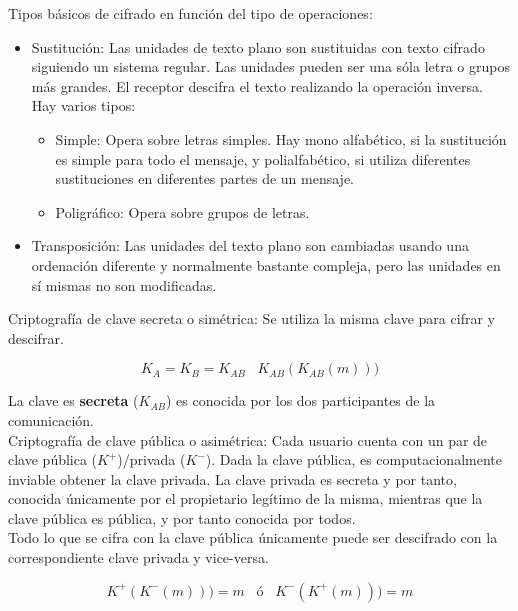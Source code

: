 \documentclass[10pt,portrait, twocolumn]{article}
\begin{document}
	Tipos básicos de cifrado en función del tipo de operaciones:
	
	\begin{itemize}
		\item Sustitución: Las unidades de texto plano son sustituidas con texto cifrado siguiendo un sistema regular. Las unidades pueden ser una sóla letra o grupos más grandes. El receptor descifra el texto realizando la operación inversa. Hay varios tipos:
			\begin{itemize}
				\item Simple: Opera sobre letras simples. Hay mono alfabético, si la sustitución es simple para todo el mensaje, y polialfabético, si utiliza diferentes sustituciones en diferentes partes de un mensaje.
				\item Poligráfico: Opera sobre grupos de letras.
			\end{itemize}
		\item Transposición: Las unidades del texto plano son cambiadas usando una ordenación diferente y normalmente bastante compleja, pero las unidades en sí mismas no son modificadas. 
	\end{itemize}
	
Criptografía de clave secreta o simétrica: Se utiliza la misma clave para cifrar y descifrar.

	\begin{equation*}
		K_A = K_B = K_{AB} \hspace{10pt} K_{AB} (K_{AB}(m)))
	\end{equation*}
	
	La clave es \textbf{secreta} ($K_{AB}$) es conocida por los dos participantes de la comunicación.\\
	
Criptografía de clave pública o asimétrica: Cada usuario cuenta con un par de clave pública ($K^+$)/privada ($K^-$). Dada la clave pública, es computacionalmente inviable obtener la clave privada. La clave privada es secreta y por tanto, conocida únicamente por el propietario legítimo de la misma, mientras que la clave pública es pública, y por tanto conocida por todos.\\
\quad Todo lo que se cifra con la clave pública únicamente puede ser descifrado con la correspondiente clave privada y vice-versa.

	\begin{equation*}
		K^+(K^-(m))) = m \hspace{10pt} \text{ó} \hspace{10pt} K^-(K^+(m))) = m
	\end{equation*}
	
\end{document}
